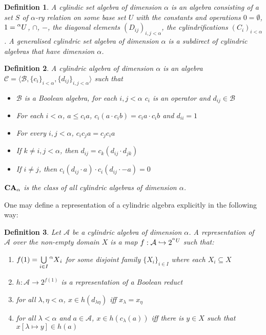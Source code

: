\documentclass[a4paper]{article}
\theoremstyle{defin}
\newtheorem{defin}{Definition}
\theoremstyle{theorem}
\theoremstyle{prop}
\theoremstyle{lemma}
\theoremstyle{fact}
\theoremstyle{ex}
\theoremstyle{col}
\begin{document}
\begin{defin}
 A cylindic set algebra of dimension $\alpha$ is an algebra consisting of a set $S$ of $\alpha$-ry relation on some base set $U$
   with the constants and operations $0 = \emptyset$, $1 = \prescript{\alpha}{}U$, $\cap$, $-$, the diagonal elements $(D_{ij})_{i, j < \alpha}$, the cylindrifications $(C_i)_{i < \alpha}$. A generalised cylindric set algebra of dimension $\alpha$ is a subdirect of cylindric algebras that have dimension $\alpha$.
\end{defin}

\begin{defin}
   A cylindric algebra of dimension $\alpha$ is an algebra $\mathcal{C} = \langle \mathcal{B}, \{ c_i \}_{i < \alpha}, \{ d_{ij} \}_{i, j < \alpha} \rangle$ such that
   \begin{itemize}
     \item $\mathcal{B}$ is a Boolean algebra, for each $i, j < \alpha$ $c_i$ is an operator and $d_{ij} \in \mathcal{B}$
     \item For each $i < \alpha$, $a \leq c_i a$, $c_i (a \cdot c_i b) = c_i a \cdot c_i b$ and $d_{ii} = 1$
     \item For every $i, j < \alpha$, $c_i c_j a = c_j c_i a$
     \item If $k \neq i, j < \alpha$, then $d_{ij} = c_k (d_{ij} \cdot d_{jk})$
     \item If $i \neq j$, then $c_i (d_{ij} \cdot a) \cdot c_i (d_{ij} \cdot - a) = 0$
   \end{itemize}
   ${\bf CA}_{\alpha}$ is the class of all cylindric algebras of dimension $\alpha$.
\end{defin}

One may define a representation of a cylindric algebra explicitly in the following way:

\begin{defin}
 Let $\mathcal{A}$ be a cylindric algebra of dimension $\alpha$. A representation of $\mathcal{A}$ over the non-empty domain $X$ is a map $f : \mathcal{A} \hookrightarrow 2^{\prescript{\alpha}{}U}$ such that:
 \begin{enumerate}
   \item $f(1) = \bigcup \limits_{i \in I} \prescript{\alpha}{}X_i$ for some disjoint family $\{X_i\}_{i \in I}$ where each $X_i \subseteq X$
   \item $h : \mathcal{A} \to 2^{f(1)}$ is a representation of a Boolean reduct
   \item for all $\lambda, \eta < \alpha$, $x \in h(d_{\lambda \eta})$ iff $x_{\lambda} = x_{\eta}$
   \item for all $\lambda < \alpha$ and $a \in \mathcal{A}$, $x \in h(c_{\lambda}(a))$ iff there is $y \in X$ such that $x[\lambda \mapsto y] \in h(a)$
 \end{enumerate}
\end{defin}
\end{document}

